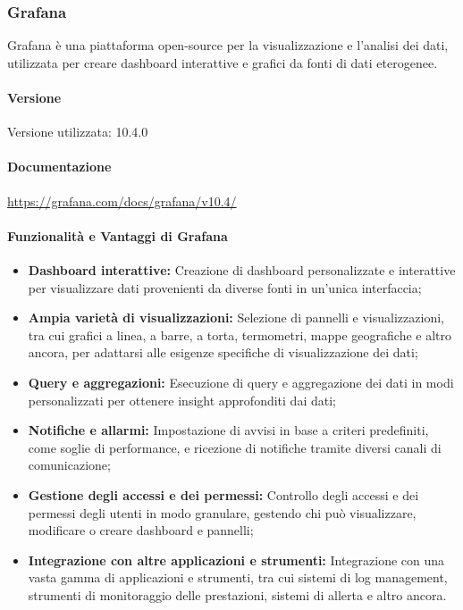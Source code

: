\subsubsection{Grafana}
Grafana è una piattaforma open-source per la visualizzazione e l'analisi dei dati, utilizzata per creare dashboard interattive e grafici da fonti di dati eterogenee. 

\paragraph{Versione}
Versione utilizzata: 10.4.0

\paragraph{Documentazione}
\url{https://grafana.com/docs/grafana/v10.4/}

\paragraph{Funzionalità e Vantaggi di Grafana}
\begin{itemize}
    \item \textbf{Dashboard interattive:} Creazione di dashboard personalizzate e interattive per visualizzare dati provenienti da diverse fonti in un'unica interfaccia;
        
    \item \textbf{Ampia varietà di visualizzazioni:} Selezione di pannelli e visualizzazioni, tra cui grafici a linea, a barre, a torta, termometri, mappe geografiche e altro ancora, per adattarsi alle esigenze specifiche di visualizzazione dei dati;
    
    \item \textbf{Query e aggregazioni:} Esecuzione di query e aggregazione dei dati in modi personalizzati per ottenere insight approfonditi dai dati;
    
    \item \textbf{Notifiche e allarmi:} Impostazione di avvisi in base a criteri predefiniti, come soglie di performance, e ricezione di notifiche tramite diversi canali di comunicazione;
    
    \item \textbf{Gestione degli accessi e dei permessi:} Controllo degli accessi e dei permessi degli utenti in modo granulare, gestendo chi può visualizzare, modificare o creare dashboard e pannelli;
    
    \item \textbf{Integrazione con altre applicazioni e strumenti:} Integrazione con una vasta gamma di applicazioni e strumenti, tra cui sistemi di log management, strumenti di monitoraggio delle prestazioni, sistemi di allerta e altro ancora.
  \end{itemize}
  
